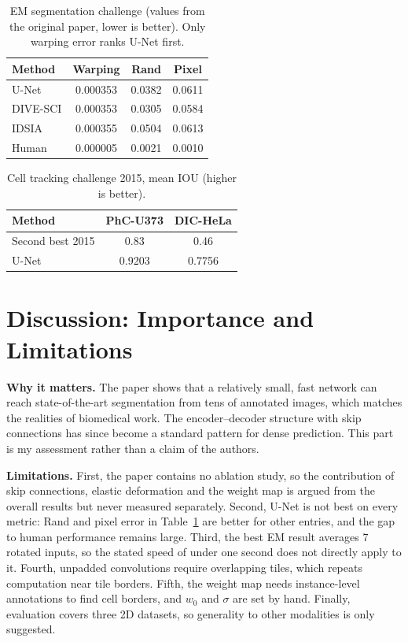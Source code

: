 \documentclass{article}
\begin{document}
\begin{table}[t]
\caption{EM segmentation challenge (values from the original paper, lower is better). Only warping error ranks U-Net first.}
\label{tab:em}
\vskip 0.15in
\begin{center}
\begin{small}
\begin{tabular}{lccc}
\toprule
Method & Warping & Rand & Pixel\\
\midrule
U-Net & 0.000353 & 0.0382 & 0.0611\\
DIVE-SCI & 0.000353 & 0.0305 & 0.0584\\
IDSIA & 0.000355 & 0.0504 & 0.0613\\
Human & 0.000005 & 0.0021 & 0.0010\\
\bottomrule
\end{tabular}
\end{small}
\end{center}
\vskip -0.1in
\end{table}

\begin{table}[t]
\caption{Cell tracking challenge 2015, mean IOU (higher is better).}
\label{tab:iou}
\vskip 0.15in
\begin{center}
\begin{small}
\begin{tabular}{lcc}
\toprule
Method & PhC-U373 & DIC-HeLa\\
\midrule
Second best 2015 & 0.83 & 0.46\\
U-Net & 0.9203 & 0.7756\\
\bottomrule
\end{tabular}
\end{small}
\end{center}
\vskip -0.1in
\end{table}

\section{Discussion: Importance and Limitations}
\textbf{Why it matters.} The paper shows that a relatively small, fast network can reach state-of-the-art segmentation from tens of annotated images, which matches the realities of biomedical work. The encoder--decoder structure with skip connections has since become a standard pattern for dense prediction. This part is my assessment rather than a claim of the authors.

\textbf{Limitations.} First, the paper contains no ablation study, so the contribution of skip connections, elastic deformation and the weight map is argued from the overall results but never measured separately. Second, U-Net is not best on every metric: Rand and pixel error in Table~\ref{tab:em} are better for other entries, and the gap to human performance remains large. Third, the best EM result averages 7 rotated inputs, so the stated speed of under one second does not directly apply to it. Fourth, unpadded convolutions require overlapping tiles, which repeats computation near tile borders. Fifth, the weight map needs instance-level annotations to find cell borders, and $w_0$ and $\sigma$ are set by hand. Finally, evaluation covers three 2D datasets, so generality to other modalities is only suggested.
\end{document}

